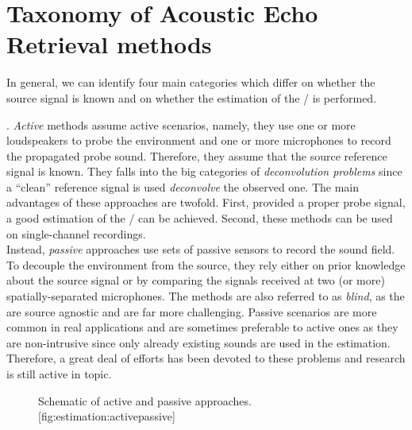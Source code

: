 \section{Taxonomy of Acoustic Echo Retrieval methods}\label{sec:estimation:taxonomy}

In general, we can identify four main categories which differ on whether the source signal is known and on whether the estimation of the \RIR/ is performed.

.
\textit{Active} methods assume active scenarios, namely, they use one or more loudspeakers to probe the environment and one or more microphones to record the propagated probe sound.
Therefore, they assume that the source reference signal is known.
They falls into the big categories of \textit{deconvolution problems} since a ``clean'' reference signal is used \textit{deconvolve} the observed one.
The main advantages of these approaches are twofold.
First, provided a proper probe signal, a good estimation of the \RIR/ can be achieved.
Second, these methods can be used on single-channel recordings.
\\Instead, \textit{passive} approaches use sets of passive sensors to record the sound field.
To decouple the environment from the source, they rely either on prior knowledge about the source signal or by comparing the signals received at two (or more) spatially-separated microphones.
The methods are also referred to as \textit{blind}, as the are source agnostic and are far more challenging.
Passive scenarios are more common in real applications and are sometimes preferable to active ones as they are non-intrusive since only already existing sounds are used in the estimation.
Therefore, a great deal of efforts has been devoted to these problems and research is still active in topic.

\begin{figure}[h]
    \begin{sidecaption}{%
        Schematic of active and passive approaches.
    }[fig:estimation:activepassive]
    \centering
    \resizebox{\linewidth}{!}{
        
    }
    \end{sidecaption}
\end{figure}


